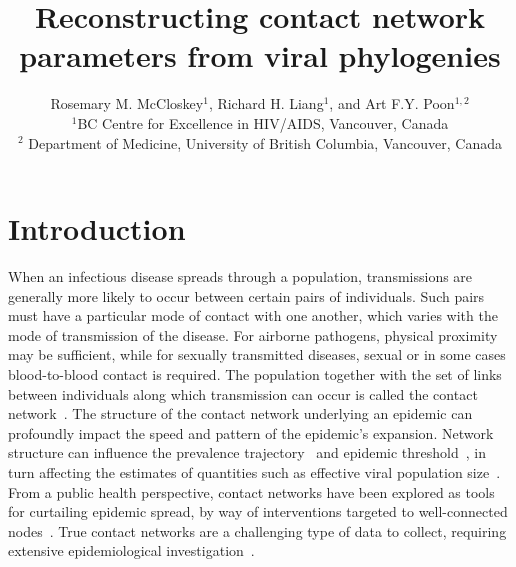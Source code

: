 \documentclass[12pt]{article}\usepackage[]{graphicx}\usepackage[]{color}
\begin{document}
\onehalfspacing

\title{Reconstructing contact network parameters from viral phylogenies}
\author{Rosemary M. McCloskey$^1$, Richard H. Liang$^1$, and Art F.Y. Poon$^{1,2}$ \\
\small $^1$BC Centre for Excellence in HIV/AIDS, Vancouver, Canada \\ \small $^2$ Department of Medicine, University of British Columbia, Vancouver, Canada}



\maketitle
\abstract{}

\section*{Introduction}

When an infectious disease spreads through a population, transmissions are
generally more likely to occur between certain pairs of individuals. Such pairs
must have a particular mode of contact with one another, which varies with the
mode of transmission of the disease. For airborne pathogens, physical proximity
may be sufficient, while for sexually transmitted diseases, sexual or in some
cases blood-to-blood contact is required. The population together with the set
of links between individuals along which transmission can occur is called the
contact network~\autocite{klovdahl1985social, morris1993epidemiology}. The
structure of the contact network underlying an epidemic can profoundly impact
the speed and pattern of the epidemic's expansion. Network structure can
influence the prevalence trajectory~\autocite{o2011contact, ma2013importance}
and epidemic threshold~\autocite{barthelemy2005dynamical}, in turn affecting
the estimates of quantities such as effective viral population
size~\autocite{goodreau2006assessing}.  From a public health perspective,
contact networks have been explored as tools for curtailing epidemic spread, by
way of interventions targeted to well-connected
nodes~\autocite{wang2015targeting}. True contact networks are a challenging
type of data to collect, requiring extensive epidemiological
investigation~\autocite{welch2011statistical, eames2015six}.
\end{document}
